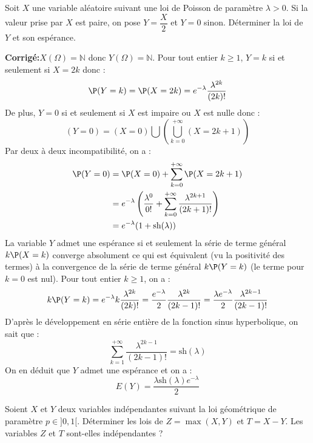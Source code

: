 \documentclass[a4paper,twoside,french,11pt]{VcCours}
\newcommand{\corr}{\textbf{Corrigé:}}
\begin{document}
\begin{Exercice}{} Soit $X$ une variable aléatoire suivant une loi de Poisson de paramètre $\lambda>0$. Si la valeur prise par $X$ est paire, on pose $Y = \dfrac{X}{2}$ et $Y=0$ sinon. Déterminer la loi de $Y$ et son espérance.
\end{Exercice}

\corr $X(\Omega) = \mathbb{N}$ donc $Y(\Omega)= \mathbb{N}$. Pour tout entier $k \geq 1$, $Y=k$ si et seulement si $X=2k$ donc :
$$ \P(Y=k) = \P(X=2k) = e^{- \lambda} \dfrac{\lambda^{2k}}{(2k)!}$$
De plus, $Y=0$ si et seulement si $X$ est impaire ou $X$ est nulle donc :
$$ (Y=0) = (X=0) \bigcup \left( \bigcup_{k=0}^{+ \infty} (X=2k+1) \right)$$
Par deux à deux incompatibilité, on a :
\begin{align*}
\P(Y=0) & = \P(X=0) + \sum_{k=0}^{+ \infty} \P(X=2k+1) \\
& = e^{- \lambda} \left( \dfrac{\lambda^0}{0!} + \sum_{k=0}^{+ \infty} \dfrac{\lambda^{2k+1}}{(2k+1)!} \right) \\
& = e^{- \lambda}( 1 + \textrm{sh}(\lambda))
\end{align*}
La variable $Y$ admet une espérance si et seulement la série de terme général $k \P(X=k)$ converge absolument ce qui est équivalent (vu la positivité des termes) à la convergence de la série de terme général $k\P(Y=k)$ (le terme pour $k=0$ est nul).  Pour tout entier $k \geq 1$, on a :
$$ k \P(Y=k) = e^{- \lambda} k \dfrac{\lambda^{2k}}{(2k)!} =\dfrac{e^{-\lambda}}{2} \dfrac{\lambda^{2k}}{(2k-1)!} = \dfrac{ \lambda e^{-\lambda}}{2} \dfrac{\lambda^{2k-1}}{(2k-1)!}$$
D'après le développement en série entière de la fonction sinus hyperbolique, on sait que :
$$ \sum_{k=1}^{+ \infty}  \dfrac{\lambda^{2k-1}}{(2k-1)!} = \textrm{sh}(\lambda)$$
On en déduit que $Y$ admet une espérance et on a :
$$ E(Y) = \dfrac{ \lambda \textrm{sh}(\lambda) e^{-\lambda}}{2}$$

\begin{Exercice}{} Soient $X$ et $Y$ deux variables indépendantes suivant la loi géométrique de paramètre $p \in ]0,1[$. Déterminer les lois de $Z= \max(X,Y)$ et $T=X-Y$. Les variables $Z$ et $T$ sont-elles indépendantes ?
\end{Exercice}
\end{document}

